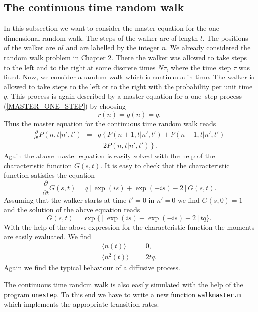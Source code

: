 \subsection{The continuous time random walk}
In this subsection we want to consider the master equation for
the one--dimensional random walk. The steps of the walker are of 
length $l$. The positions of the walker are $nl$ and are labelled
by the integer $n$. We already considered the random walk problem 
in Chapter 2.  There the walker was allowed to take steps 
to the left and to the right at some 
discrete times $N\tau$, where the time step $\tau$ was fixed.
Now, we consider a random walk which is continuous in time. The 
walker is allowed to take steps to the left or to the right with 
the probability per unit time $q$. This process is again described 
by a master equation for a one--step process (\ref{MASTER_ONE_STEP})
by choosing
\begin{equation*}
r(n) =g(n) =q.
\end{equation*}
Thus the master equation for the continuous time random walk
reads
\begin{eqnarray*}
\frac{\partial}{\partial t} P(n,t|n',t') &=& 
       q \left\{ P(n+1,t|n',t') + P(n-1,t|n',t')\right. \\
       && \left.  - 2 P(n,t|n',t')  \right\}.
\end{eqnarray*}
Again the above master equation is easily solved with the help of 
the characteristic function $G(s,t)$. It is easy to check that the
characteristic function satisfies the equation
\begin{equation*}
\frac{\partial}{\partial t} G(s,t) = q [\exp(is) +\exp(-is) -2] G(s,t).
\end{equation*}
Assuming that the walker starts at time $t'=0$ in $n'=0$ we find
$G(s,0)=1$ and the solution of the above equation reads
\begin{equation*}
G(s,t) = \exp\{[ \exp(is) +\exp(-is) -2  ]tq\}.
\end{equation*}
With the help of the above expression for the characteristic 
function the moments are easily evaluated. We find
\begin{eqnarray*}
\langle n(t) \rangle &=& 0, \\
\langle n^2(t) \rangle &=& 2tq.
\end{eqnarray*}
Again we find the typical behaviour of a diffusive process.

The continuous time random walk is also easily simulated with the
help of the program \texttt{onestep}. To this end we have to write
a new function \texttt{walkmaster.m} which implements the 
appropriate transition rates.

